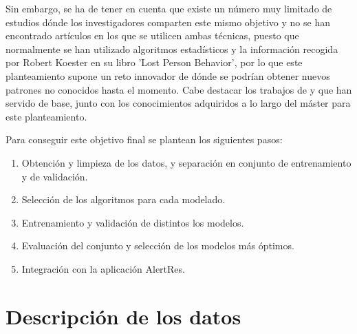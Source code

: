 Sin embargo, se ha de tener en cuenta que existe un número muy limitado de estudios dónde los investigadores comparten este mismo objetivo y no se han encontrado artículos en los que se utilicen ambas técnicas, puesto que normalmente se han utilizado algoritmos estadísticos y la información recogida por Robert Koester en su libro 'Lost Person Behavior'\cite{libroLostPersonBehavior}, por lo que este planteamiento supone un reto innovador de dónde se podrían obtener nuevos patrones no conocidos hasta el momento. Cabe destacar los trabajos de \cite{Agent_based_pred1} y \cite{Agent_based_pred2} que han servido de base, junto con los conocimientos adquiridos a lo largo del máster para este planteamiento.

Para conseguir este objetivo final se plantean los siguientes pasos:
\begin{enumerate}
\item Obtención y limpieza de los datos, y separación en conjunto de entrenamiento y de validación.
\item Selección de los algoritmos para cada modelado.
\item Entrenamiento y validación de distintos los modelos.
\item Evaluación del conjunto y selección de los modelos más óptimos.
\item Integración con la aplicación AlertRes.
\end{enumerate}


\section{Descripción de los datos}

